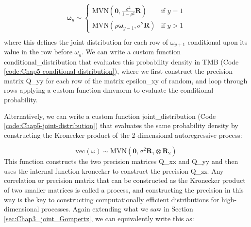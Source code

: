 \begin{equation}
\begin{gathered}
    \mathbf{\omega}_{y} \sim 
    \begin{cases}
        \mathrm{MVN}\left(\mathbf{0},\frac{\sigma^2}{1-\rho^2} \mathbf{R}\right) & \text{if } y=1 \\ 
        \mathrm{MVN}\left(\rho \mathbf{\omega}_{y-1},\sigma^2 \mathbf{R}\right) & \text{if } y>1 
    \end{cases} \\
\end{gathered}
\end{equation}
where this defines the joint distribution for each row of \(\omega_{y+1}\) conditional upon its value in the row before \(\omega_{y}\). We can write a custom function \colorbox{backblue}{conditional\_distribution} that evaluates this probability density in TMB (Code \ref{code:Chap5-conditional-distribution}), where we first construct the precision matrix \colorbox{backblue}{Q\_yy} for each row of the matrix \colorbox{backblue}{epsilon\_xy} of random, and loop through rows applying a custom function \colorbox{backblue}{dmvnorm} to evaluate the conditional probability.  

\lstset{style=TMBcode}


Alternatively, we can write a custom function \colorbox{backblue}{joint\_distribution} (Code \ref{code:Chap5-joint-distribution}) that evaluates the same probability density by constructing the Kronecker product of the 2-dimensional autoregressive process:

\begin{equation} \label{eq:Chap5_joint}
    \mathrm{vec}(\omega) \sim \mathrm{MVN}(\mathbf{0},\sigma^2 \mathbf{R}_1 \otimes \mathbf{R}_2)
\end{equation}
This function constructs the two precision matrices \colorbox{backblue}{Q\_xx} and \colorbox{backblue}{Q\_yy} and then uses the internal function \colorbox{backblue}{kronecker} to construct the precision \colorbox{backblue}{Q\_zz}.  Any correlation or precision matrix that can be constructed as the Kronecker product of two smaller matrices is called a  process, and constructing the precision in this way is the key to constructing computationally efficient distributions for high-dimensional processes. Again extending what we saw in Section \ref{sec:Chap3_joint_Gompertz}, we can equivalently write this as:


